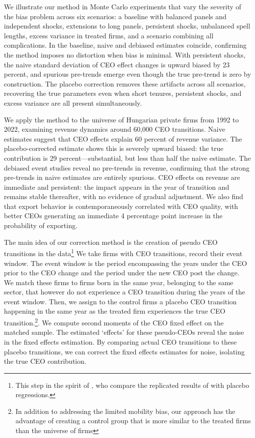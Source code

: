 \documentclass[11pt,a4paper]{article}
\begin{document}
We illustrate our method in Monte Carlo experiments that vary the severity of the bias problem across six scenarios: a baseline with balanced panels and independent shocks, extensions to long panels, persistent shocks, unbalanced spell lengths, excess variance in treated firms, and a scenario combining all complications. In the baseline, naive and debiased estimates coincide, confirming the method imposes no distortion when bias is minimal. With persistent shocks, the naive standard deviation of CEO effect changes is upward biased by 23 percent, and spurious pre-trends emerge even though the true pre-trend is zero by construction. The placebo correction removes these artifacts across all scenarios, recovering the true parameters even when short tenures, persistent shocks, and excess variance are all present simultaneously.

We apply the method to the universe of Hungarian private firms from 1992 to 2022, examining revenue dynamics around 60,000 CEO transitions. Naive estimates suggest that CEO effects explain 60 percent of revenue variance. The placebo-corrected estimate shows this is severely upward biased: the true contribution is 29 percent—substantial, but less than half the naive estimate. The debiased event studies reveal no pre-trends in revenue, confirming that the strong pre-trends in naive estimates are entirely spurious. CEO effects on revenue are immediate and persistent: the impact appears in the year of transition and remains stable thereafter, with no evidence of gradual adjustment. We also find that export behavior is contemporaneously correlated with CEO quality, with better CEOs generating an immediate 4 percentage point increase in the probability of exporting.


The main idea of our correction method is the creation of pseudo CEO transitions in the data\footnote{This step in the spirit of \cite{jarosiewicz2023revisiting}, who compare the replicated results of  \cite{Bertrand2003-io} with placebo regressions.} We take firms with CEO transitions, record their event window. The event window is the period encompassing the years under the CEO prior to the CEO change and the period under the new CEO post the change. We match these firms to firms born in the same year, belonging to the same sector, that however do not experience a CEO transition during the years of the event window. Then, we assign to the control firms a placebo CEO transition happening in the same year as the treated firm experiences the true CEO transition.\footnote{In addition to addressing the limited mobility bias, our approach has the advantage of creating a control group that is more similar to the treated firms than the universe of firms}. We compute second moments of the CEO fixed effect on the matched sample. The estimated `effects' for these pseudo-CEOs reveal the noise in the fixed effects estimation. By comparing actual CEO transitions to these placebo transitions, we can correct the fixed effects estimates for noise, isolating the true CEO contribution.
\end{document}
